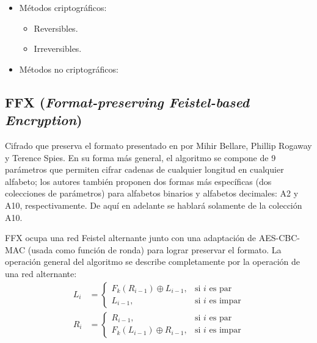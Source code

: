 
\begin{itemize}
  \item Métodos criptográficos:
  \begin{itemize}
    \item Reversibles.
    \item Irreversibles.
  \end{itemize}
  \item Métodos no criptográficos:
\end{itemize}

\subsection{FFX (\textit{Format-preserving Feistel-based Encryption})}

Cifrado que preserva el formato presentado en \cite{ffx_1} por Mihir Bellare,
Phillip Rogaway y Terence Spies.  En su forma más general, el algoritmo se
compone de 9 parámetros que permiten cifrar cadenas de cualquier longitud en
cualquier alfabeto; los autores también proponen dos formas más específicas (dos
colecciones de parámetros) para alfabetos binarios y alfabetos decimales: A2 y
A10, respectivamente. De aquí en adelante se hablará solamente de la colección
A10.


FFX ocupa una red Feistel alternante junto con una adaptación de AES-CBC-MAC
(usada como función de ronda) para lograr preservar el formato. La operación
general del algoritmo se describe completamente por la operación de una red
alternante:
\begin{equation}
  \begin{split}
    L_{i} &=
    \begin{cases}
      F_k(R_{i - 1}) \oplus L_{i - 1},  & \text{si } i \text{ es par} \\
      L_{i - 1},                          & \text{si } i \text{ es impar}
    \end{cases}
    \\
    R_{i} &=
    \begin{cases}
      R_{i - 1},                          & \text{si } i \text{ es par} \\
      F_k(L_{i - 1}) \oplus R_{i - 1},  & \text{si } i \text{ es impar}
    \end{cases}
  \end{split}
\end{equation}

